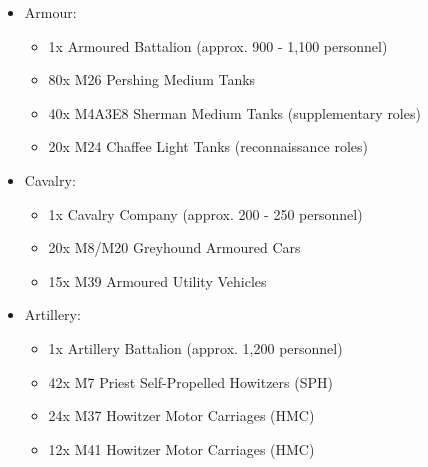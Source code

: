 \documentclass[a4paper,12pt]{article}
\begin{document}
{\begin{itemize}
		\item Armour:
		\begin{itemize}
			\item 1x Armoured Battalion (approx. 900 - 1,100 personnel)
			\item 80x M26 Pershing Medium Tanks
			\item 40x M4A3E8 Sherman Medium Tanks (supplementary roles)
			\item 20x M24 Chaffee Light Tanks (reconnaissance roles)
		\end{itemize}
		\item Cavalry:
		\begin{itemize}
			\item 1x Cavalry Company (approx. 200 - 250 personnel)
			\item 20x M8/M20 Greyhound Armoured Cars
			\item 15x M39 Armoured Utility Vehicles
		\end{itemize}
		\item Artillery:
		\begin{itemize}
			\item 1x Artillery Battalion (approx. 1,200 personnel)
			\item 42x M7 Priest Self-Propelled Howitzers (SPH)
			\item 24x M37 Howitzer Motor Carriages (HMC)
			\item 12x M41 Howitzer Motor Carriages (HMC)
		\end{itemize}
	\end{itemize}
}

\clearpage
\end{document}
